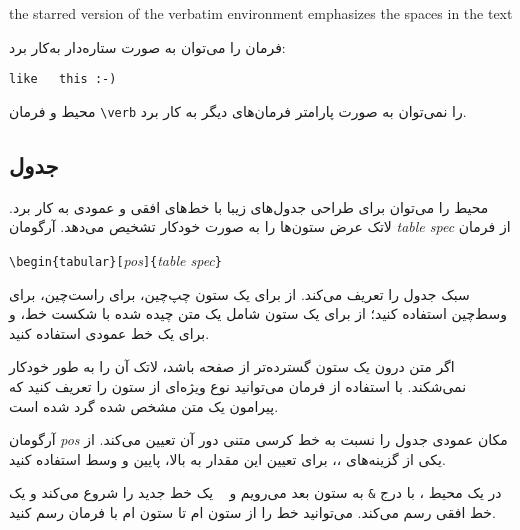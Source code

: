 \begin{example}
\begin{verbatim*}
the starred version of
the      verbatim   
environment emphasizes
the spaces   in the text
\end{verbatim*}
\end{example}
فرمان
را می‌توان به صورت ستاره‌دار به‌کار برد:

\begin{example}
\verb*|like   this :-) |
\end{example}
محیط 
و فرمان 
\verb|\verb|
را نمی‌توان به صورت پارامتر فرمان‌های دیگر به کار برد.

\subsection{جدول}

\newcommand{\mfr}[1]{\lr{\framebox{\rule{0pt}{0.7em}\texttt{#1}}}}

محیط 
را می‌توان برای طراحی جدول‌های زیبا با خط‌های افقی و عمودی به کار برد. لاتک عرض ستون‌ها را به صورت خودکار تشخیص می‌دهد. آرگومان 
\emph{table spec}
از فرمان

\begin{lscommand}
\verb|\begin{tabular}[|\emph{pos}\verb|]{|\emph{table spec}\verb|}|
\end{lscommand} 

\noindent 
سبک‌ جدول را تعریف می‌کند. از 
\mfr{l}
برای یک ستون چپ‌چین، 
\mfr{r}
برای راست‌چین، 
\mfr{c}
برای وسط‌چین استفاده کنید؛ از 
\mfr{p\{\emph{width}\}}
برای یک ستون شامل یک متن چیده شده با شکست خط، و 
\mfr{l}
برای یک خط عمودی استفاده کنید.

اگر متن درون یک ستون گسترده‌‌تر از صفحه باشد، لاتک آن را به طور خودکار نمی‌شکند. با استفاده از فرمان 
\mfr{p\{\emph{width}\}}
می‌توانید نوع ویژه‌ای از ستون را تعریف کنید که پیرامون یک متن مشخص شده گرد شده است.

آرگومان 
\emph{pos}
مکان عمودی جدول را نسبت به خط کرسی متنی دور آن تعیین می‌کند. از یکی از گزینه‌های 
\mfr{t}،\mfr{b}،\mfr{c}
برای تعیین این مقدار به بالا، پایین و وسط استفاده کنید.

در یک محیط 
،
با درج 
\texttt{\&}
به ستون بعد می‌رویم و 
\
 \ci{\bs}
یک خط جدید را شروع می‌کند و 
یک خط افقی رسم می‌کند. می‌توانید خط را از ستون 
ام
تا ستون 
ام
با فرمان 
رسم کنید.


